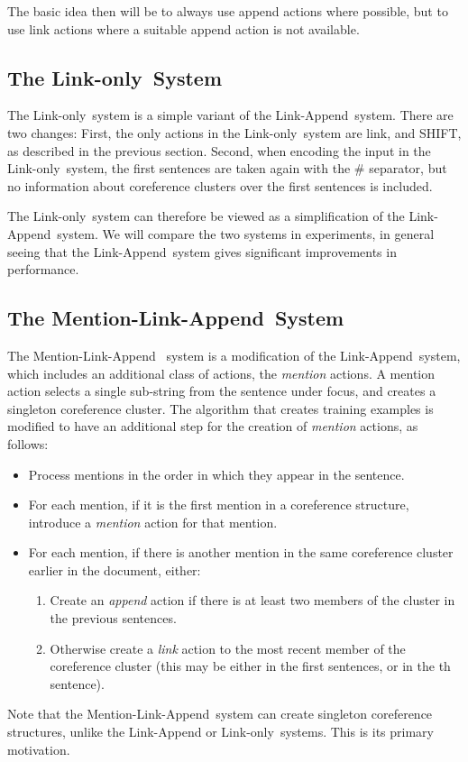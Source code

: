 \documentclass[11pt,a4paper]{article}
\newcommand{\LA}{Link-Append}
\newcommand{\M}{Mention-Link-Append}
\newcommand{\LO}{Link-only}
\begin{document}
The basic idea then will be to always use append actions where possible, but to use link actions where a suitable append action is not available. 

\subsection{The \LO~System}

The \LO~system is a simple variant of the \LA~system. There are two changes: First, the only actions in the \LO~system are link, and SHIFT, as described in the previous section. Second, when encoding the input in the \LO~system, the first  sentences are taken again with the \# separator, but no information about coreference clusters over the first  sentences is included.

The \LO~system can therefore be viewed as a simplification of the \LA~system. We will compare the two systems in experiments, in general seeing that the \LA~system gives significant improvements in performance.

\subsection{The \M~System}

The \M~ system is a modification of the \LA~system, which includes an additional class of actions, the {\em mention} actions. A mention action selects a single sub-string from the sentence under focus, and creates a singleton coreference cluster. The algorithm that creates training examples is modified to have an additional step for the creation of {\em mention} actions, as follows: 

\begin{itemize}
    \item Process mentions in the order in which they appear in the sentence. 
    
    \item For each mention, if it is the first mention in a coreference structure, introduce a {\em mention} action for that mention.
    
    \item For each mention, if there is another mention in the same coreference cluster earlier in the document, either:
    
    \begin{enumerate}
        \item Create an {\em append} action if there is at least two members of the cluster in the previous  sentences.
        \item Otherwise create a {\em link} action to the most recent member of the coreference cluster (this may be either in the first  sentences, or in the th sentence).
    \end{enumerate}
    
\end{itemize}
Note that the \M~system can create singleton coreference structures, unlike the {\sc Link-Append} or \LO~systems. This is its primary motivation.
\end{document}

